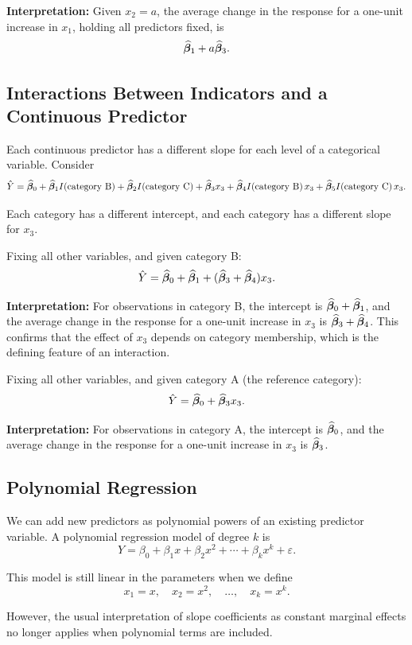 \textbf{Interpretation:} Given $x_2 = a$, the average change in the response for a one-unit increase in $x_1$, holding all predictors fixed, is
\[
\widehat{\boldsymbol{\beta}}_1 + a \widehat{\boldsymbol{\beta}}_3.
\]

\subsection{Interactions Between Indicators and a Continuous Predictor}

Each continuous predictor has a different slope for each level of a categorical variable. Consider
\[
\hat{Y}
= \widehat{\boldsymbol{\beta}}_0
+ \widehat{\boldsymbol{\beta}}_1 I(\text{category B})
+ \widehat{\boldsymbol{\beta}}_2 I(\text{category C})
+ \widehat{\boldsymbol{\beta}}_3 x_3
+ \widehat{\boldsymbol{\beta}}_4 I(\text{category B})\,x_3
+ \widehat{\boldsymbol{\beta}}_5 I(\text{category C})\,x_3.
\]

Each category has a different intercept, and each category has a different slope for $x_3$.

Fixing all other variables, and given category B:
\[
\hat{Y}
= \widehat{\boldsymbol{\beta}}_0 + \widehat{\boldsymbol{\beta}}_1 + (\widehat{\boldsymbol{\beta}}_3 + \widehat{\boldsymbol{\beta}}_4) x_3.
\]

\textbf{Interpretation:} For observations in category B, the intercept is $\widehat{\boldsymbol{\beta}}_0 + \widehat{\boldsymbol{\beta}}_1$, and the average change in the response for a one-unit increase in $x_3$ is $\widehat{\boldsymbol{\beta}}_3 + \widehat{\boldsymbol{\beta}}_4$. This confirms that the effect of $x_3$ depends on category membership, which is the defining feature of an interaction.

Fixing all other variables, and given category A (the reference category):
\[
\hat{Y}
= \widehat{\boldsymbol{\beta}}_0 + \widehat{\boldsymbol{\beta}}_3 x_3.
\]

\textbf{Interpretation:} For observations in category A, the intercept is $\widehat{\boldsymbol{\beta}}_0$, and the average change in the response for a one-unit increase in $x_3$ is $\widehat{\boldsymbol{\beta}}_3$.

\subsection{Polynomial Regression}

We can add new predictors as polynomial powers of an existing predictor variable. A polynomial regression model of degree $k$ is
\[
Y = \beta_0 + \beta_1 x + \beta_2 x^2 + \cdots + \beta_k x^k + \varepsilon.
\]

This model is still linear in the parameters when we define
\[
x_1 = x, \quad x_2 = x^2, \quad \ldots, \quad x_k = x^k.
\]

However, the usual interpretation of slope coefficients as constant marginal effects no longer applies when polynomial terms are included.

